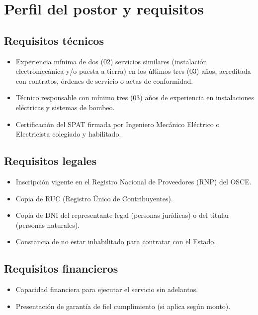 \documentclass[12pt,a4paper]{article}
\begin{document}
\section{Perfil del postor y requisitos}

\subsection{Requisitos técnicos}

\begin{itemize}
  \item Experiencia mínima de dos (02) servicios similares (instalación electromecánica y/o puesta a tierra) en los últimos tres (03) años, acreditada con contratos, órdenes de servicio o actas de conformidad.
  \item Técnico responsable con mínimo tres (03) años de experiencia en instalaciones eléctricas y sistemas de bombeo.
  \item Certificación del SPAT firmada por Ingeniero Mecánico Eléctrico o Electricista colegiado y habilitado.
\end{itemize}

\subsection{Requisitos legales}

\begin{itemize}
  \item Inscripción vigente en el Registro Nacional de Proveedores (RNP) del OSCE.
  \item Copia de RUC (Registro Único de Contribuyentes).
  \item Copia de DNI del representante legal (personas jurídicas) o del titular (personas naturales).
  \item Constancia de no estar inhabilitado para contratar con el Estado.
\end{itemize}

\subsection{Requisitos financieros}

\begin{itemize}
  \item Capacidad financiera para ejecutar el servicio sin adelantos.
  \item Presentación de garantía de fiel cumplimiento (si aplica según monto).
\end{itemize}
\end{document}
